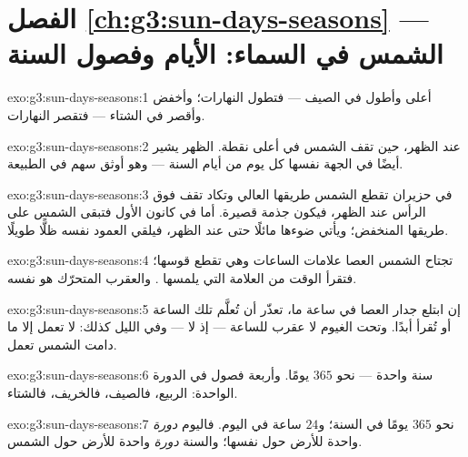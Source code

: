 \section*{الفصل \ref{ch:g3:sun-days-seasons} --- الشمس في السماء: الأيام وفصول السنة}

\begin{solution}{exo:g3:sun-days-seasons:1}
أعلى وأطول في الصيف --- فتطول النهارات؛ وأخفض وأقصر في الشتاء
--- فتقصر النهارات.
\end{solution}

\begin{solution}{exo:g3:sun-days-seasons:2}
عند الظهر، حين تقف الشمس في أعلى نقطة.  الظهر يشير أيضًا في
الجهة نفسها كل يوم من أيام السنة --- وهو أوثق سهم في الطبيعة.
\end{solution}

\begin{solution}{exo:g3:sun-days-seasons:3}
في حزيران تقطع الشمس طريقها العالي وتكاد تقف فوق الرأس عند
الظهر، فيكون  جذمة قصيرة. أما في كانون الأول فتبقى الشمس
على طريقها المنخفض؛ ويأتي ضوءها مائلًا حتى عند الظهر، فيلقي
العمود نفسه ظلًّا طويلًا.
\end{solution}

\begin{solution}{exo:g3:sun-days-seasons:4}
تجتاح الشمس  العصا علامات الساعات وهي تقطع قوسها؛ فتقرأ
الوقت من العلامة التي يلمسها . والعقرب المتحرّك هو 
نفسه.
\end{solution}

\begin{solution}{exo:g3:sun-days-seasons:5}
إن ابتلع  جدار العصا في ساعة ما، تعذّر أن تُعلَّم تلك الساعة
أو تُقرأ أبدًا. وتحت الغيوم لا عقرب للساعة --- إذ لا  ---
وفي الليل كذلك:  لا تعمل إلا ما دامت الشمس تعمل.
\end{solution}

\begin{solution}{exo:g3:sun-days-seasons:6}
سنة واحدة --- نحو $365$ يومًا. وأربعة فصول في الدورة الواحدة:
الربيع، فالصيف، فالخريف، فالشتاء.
\end{solution}

\begin{solution}{exo:g3:sun-days-seasons:7}
نحو $365$ يومًا في السنة؛ و$24$ ساعة في اليوم. فاليوم
\emph{دورة} واحدة للأرض حول نفسها؛ والسنة \emph{دورة} واحدة
للأرض حول الشمس.
\end{solution}

